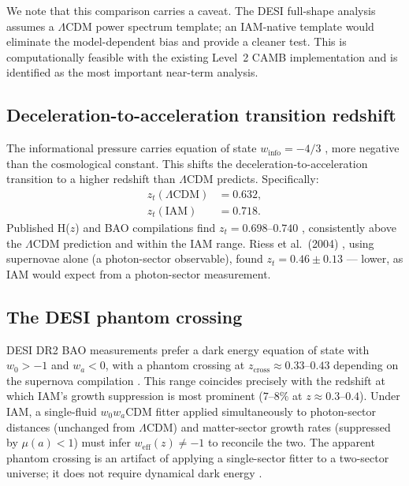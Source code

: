 \documentclass[12pt,a4paper]{article}
\begin{document}
We note that this comparison carries a caveat. The DESI full-shape analysis
assumes a $\Lambda$CDM power spectrum template; an IAM-native template would
eliminate the model-dependent bias and provide a cleaner test. This is
computationally feasible with the existing Level~2 CAMB implementation and is
identified as the most important near-term analysis.

\subsection{Deceleration-to-acceleration transition redshift}

The informational pressure carries equation of state $w_\mathrm{info} = -4/3$
\citep{mahaffey2026}, more negative than the cosmological constant. This
shifts the deceleration-to-acceleration transition to a higher redshift than
$\Lambda$CDM predicts. Specifically:
\begin{align}
  z_t(\Lambda\mathrm{CDM}) &= 0.632, \\
  z_t(\mathrm{IAM}) &= 0.718.
\end{align}
Published H($z$) and BAO compilations find $z_t = 0.698$--$0.740$
\citep{farooq2013,mamon2017,jesus2020}, consistently above the $\Lambda$CDM
prediction and within the IAM range. Riess et al.\ (2004) \citep{riess2004},
using supernovae alone (a photon-sector observable), found $z_t = 0.46 \pm
0.13$ --- lower, as IAM would expect from a photon-sector measurement.

\subsection{The DESI phantom crossing}

DESI DR2 BAO measurements prefer a dark energy equation of state with
$w_0 > -1$ and $w_a < 0$, with a phantom crossing at $z_\mathrm{cross} \approx
0.33$--$0.43$ depending on the supernova compilation \citep{desi2025_dr2}.
This range coincides precisely with the redshift at which IAM's growth
suppression is most prominent ($7$--$8\%$ at $z \approx 0.3$--$0.4$). Under
IAM, a single-fluid $w_0 w_a$CDM fitter applied simultaneously to
photon-sector distances (unchanged from $\Lambda$CDM) and matter-sector growth
rates (suppressed by $\mu(a) < 1$) must infer $w_\mathrm{eff}(z) \neq -1$ to
reconcile the two. The apparent phantom crossing is an artifact of applying a
single-sector fitter to a two-sector universe; it does not require dynamical
dark energy \citep{mahaffey2026_desi}.
\end{document}
